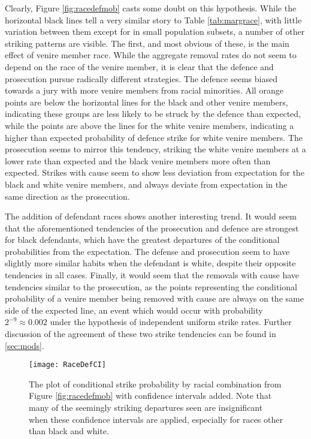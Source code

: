 Clearly, Figure \ref{fig:racedefmob} casts some doubt on this hypothesis. While the horizontal black lines tell a very similar
story to Table \ref{tab:margrace}, with little variation between them except for in small population subsets, a number of other
striking patterns are visible. The first, and most obvious of these, is the main effect of venire member race. While the aggregate
removal rates do not seem to depend on the race of the venire member, it is clear that the defence and prosecution pursue
radically different strategies. The defence seems biased towards a jury with more venire members from racial minorities. All
orange points are below the horizontal lines for the black and other venire members, indicating these groups are less likely to be
struck by the defence than expected, while the points are above the lines for the white venire members, indicating a higher than
expected probability of defence strike for white venire members. The prosecution seems to mirror this tendency, striking the
white venire members at a lower rate than expected and the black venire members more often than expected. Strikes with cause
seem to show less deviation from expectation for the black and white venire members, and always deviate from expectation
in the same direction as the prosecution.

The addition of defendant races shows another interesting trend. It would seem that the aforementioned tendencies of the
prosecution and defence are strongest for black defendants, which have the greatest departures of the conditional probabilities
from the expectation. The defense and prosecution seem to have slightly more similar habits when the defendant is white, despite
their opposite tendencies in all cases. Finally, it would seem that the removals with cause have tendencies similar to the
prosecution, as the points representing the conditional probability of a venire member being removed with cause are always on the
same side of the expected line, an event which would occur with probability $2^{-9} \approx 0.002$ under the hypothesis of
independent uniform strike rates. Further discussion of the agreement of these two strike tendencies can be found in
\ref{sec:mods}.

\begin{figure}[h!]
  \centering
  \texttt{[image: RaceDefCI]}
  \caption[Strikes by Racial Combination with Confidence
  Intervals (Sunsine)]{\footnotesize The plot of conditional strike probability by racial
    combination from Figure \ref{fig:racedefmob} with confidence intervals added. Note that many of the seemingly striking departures seen are
    insignificant when these confidence intervals are applied,
    especially for races other than black and white.}
  \label{fig:racedefci}
\end{figure}

